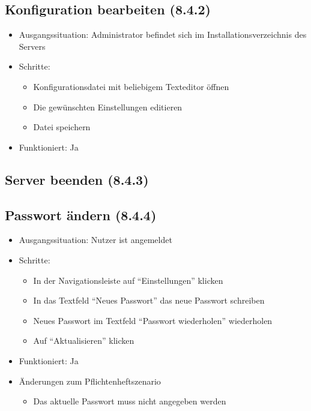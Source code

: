 \documentclass[a4paper]{scrreprt}
\begin{document}
            \subsection{Konfiguration bearbeiten (8.4.2)}
            \begin{itemize}
                \item Ausgangssituation: Administrator befindet sich im Installationsverzeichnis des Servers
                \item Schritte:
                    \begin{itemize}
                        \item Konfigurationsdatei mit beliebigem Texteditor öffnen
                        \item Die gewünschten Einstellungen editieren
                        \item Datei speichern
                    \end{itemize}
                \item Funktioniert: Ja
            \end{itemize}

            \subsection{Server beenden (8.4.3)}

            \subsection{Passwort ändern (8.4.4)}
            \begin{itemize}
                \item Ausgangssituation: Nutzer ist angemeldet
                \item Schritte:
                    \begin{itemize}
                        \item In der Navigationsleiste auf \enquote{Einstellungen} klicken
                        \item In das Textfeld \enquote{Neues Passwort} das neue Passwort schreiben
                        \item Neues Passwort im Textfeld \enquote{Passwort wiederholen} wiederholen
                        \item Auf \enquote{Aktualisieren} klicken
                    \end{itemize}
                \item Funktioniert: Ja
                \item Änderungen zum Pflichtenheftszenario
                \begin{itemize}
                    \item Das aktuelle Passwort muss nicht angegeben werden
                \end{itemize}
            \end{itemize}
\end{document}
